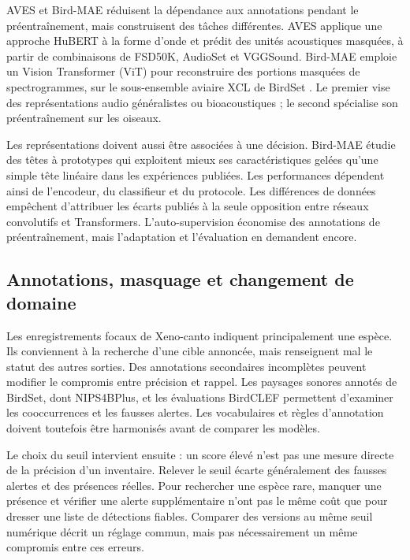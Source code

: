 \documentclass{technology_watch}
\begin{document}
AVES et Bird-MAE réduisent la dépendance aux annotations pendant le
préentraînement, mais construisent des tâches différentes. AVES applique une
approche HuBERT à la forme d'onde et prédit des unités acoustiques masquées, à
partir de combinaisons de FSD50K, AudioSet et VGGSound\cite{aves2023}.
Bird-MAE emploie un Vision Transformer (ViT) pour reconstruire des portions
masquées de spectrogrammes, sur le sous-ensemble aviaire XCL de BirdSet
\cite{birdmae2025}. Le premier vise des représentations audio généralistes ou
bioacoustiques ; le second spécialise son préentraînement sur les oiseaux.

Les représentations doivent aussi être associées à une décision. Bird-MAE
étudie des têtes à prototypes qui exploitent mieux ses caractéristiques gelées
qu'une simple tête linéaire dans les expériences publiées\cite{birdmae2025}.
Les performances dépendent ainsi de l'encodeur, du classifieur et du protocole.
Les différences de données empêchent d'attribuer les écarts publiés à la seule
opposition entre réseaux convolutifs et Transformers. L'auto-supervision
économise des annotations de préentraînement, mais l'adaptation et l'évaluation
en demandent encore.

\subsection{Annotations, masquage et changement de domaine}

Les enregistrements focaux de Xeno-canto indiquent principalement une espèce.
Ils conviennent à la recherche d'une cible annoncée, mais renseignent mal le
statut des autres sorties. Des annotations secondaires incomplètes peuvent
modifier le compromis entre précision et rappel\cite{ghani2025}. Les paysages
sonores annotés de BirdSet, dont NIPS4BPlus\cite{morfi2019,birdset2025}, et les
évaluations BirdCLEF\cite{birdclef2025} permettent d'examiner les cooccurrences
et les fausses alertes. Les vocabulaires et règles d'annotation doivent toutefois
être harmonisés avant de comparer les modèles.

Le choix du seuil intervient ensuite : un score élevé n'est pas une mesure
directe de la précision d'un inventaire. Relever le seuil écarte généralement
des fausses alertes et des présences réelles\cite{perez2023}. Pour rechercher
une espèce rare, manquer une présence et vérifier une alerte supplémentaire
n'ont pas le même coût que pour dresser une liste de détections fiables.
Comparer des versions au même seuil numérique décrit un réglage commun,
mais pas nécessairement un même compromis entre ces erreurs.
\end{document}
